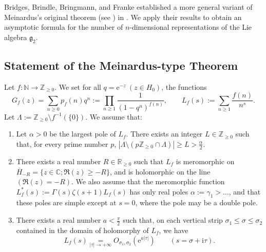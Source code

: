 \documentclass[a4paper]{amsart}
\theoremstyle{remark}
\theoremstyle{definition}
\newcommand{\phie}{\mathrm{e}}
\newcommand{\phii}{\mathrm{i}}
\begin{document}
Bridges, Brindle, Bringmann, and Franke established a more general variant of Meinardus's original theorem (see \cite{andrews1976partitions}) in \cite{bridges2024asymptotic}. We apply their results to obtain an asymptotic formula for the number of $n$-dimensional representations of the Lie algebra $\mathfrak{g}_2$.

\subsection{Statement of the Meinardus-type Theorem}
\label{subsection:meinardus_type_theorem}

Let $f: \mathbb{N} \to \mathbb{Z}_{\geq 0}$. We set for all $q=\phie^{-z} \ (z \in H_0)$, the functions
$$ G_f(z) = \sum_{n \geq 0} p_f(n) q^n := \prod_{n \geq 1} \frac{1}{(1-q^n)^{f(n)}}, \qquad L_f(s):=\sum_{n \geq 1} \frac{f(n)}{n^s}. $$
Let $\Lambda := \mathbb{Z}_{\geq 0} \setminus f^{-1}(\{ 0 \})$. We assume that:
\begin{enumerate}
    \item[(P1)] Let $\alpha>0$ be the largest pole of $L_f$. There exists an integer $L \in \mathbb{Z}_{\geq 0}$ such that, for every prime number $p$, $\left|\Lambda \setminus (p\mathbb{Z}_{\geq 0} \cap \Lambda) \right| \geq L > \frac{\alpha}{2}$.
    \item[(P2)] There exists a real number $R \in \mathbb{R}_{\geq 0}$ such that $L_f$ is meromorphic on $\overline{H}_{-R} = \{ z \in \mathbb{C}; \Re(z) \geq -R \}$, and is holomorphic on the line $(\Re(z) = -R)$. We also assume that the meromorphic function $L_f^*(s) := \Gamma(s) \zeta(s+1) L_f(s)$ has only real poles $\alpha := \gamma_1 > \ldots$, and that these poles are simple except at $s=0$, where the pole may be a double pole.
    \item[(P3)] There exists a real number $a < \frac{\pi}{2}$ such that, on each vertical strip $\sigma_1 \leq \sigma \leq \sigma_2$ contained in the domain of holomorphy of $L_f$, we have
    $$ L_f(s)\underset{|\tau| \to +\infty}{=} O_{\sigma_1,\sigma_2} \left( \phie^{a|\tau|} \right) \qquad (s=\sigma+\phii \tau).$$
\end{enumerate}
\end{document}
